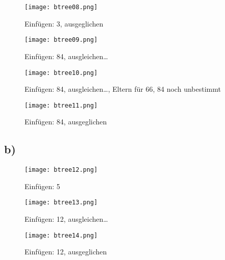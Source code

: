 \documentclass[a4paper]{article}
\begin{document}
\begin{figure}[!h]
	\begin{center}
		\texttt{[image: btree08.png]}
	\end{center}
	\caption{Einfügen: 3, ausgeglichen}
	\label{fig:btree08}
\end{figure}

\begin{figure}[!h]
	\begin{center}
		\texttt{[image: btree09.png]}
	\end{center}
	\caption{Einfügen: 84, ausgleichen\ldots}
	\label{fig:btree09}
\end{figure}

\begin{figure}[!h]
	\begin{center}
		\texttt{[image: btree10.png]}
	\end{center}
	\caption{Einfügen: 84, ausgleichen\ldots, Eltern für 66, 84 noch unbestimmt}
	\label{fig:btree10}
\end{figure}

\begin{figure}[!h]
	\begin{center}
		\texttt{[image: btree11.png]}
	\end{center}
	\caption{Einfügen: 84, ausgeglichen}
	\label{fig:btree11}
\end{figure}

\clearpage
\subsection*{b)}

\begin{figure}[!h]
	\begin{center}
		\texttt{[image: btree12.png]}
	\end{center}
	\caption{Einfügen: 5}
	\label{fig:btree12}
\end{figure}

\begin{figure}[!h]
	\begin{center}
		\texttt{[image: btree13.png]}
	\end{center}
	\caption{Einfügen: 12, ausgleichen\ldots}
	\label{fig:btree13}
\end{figure}

\begin{figure}[!h]
	\begin{center}
		\texttt{[image: btree14.png]}
	\end{center}
	\caption{Einfügen: 12, ausgeglichen}
	\label{fig:btree14}
\end{figure}
\end{document}

